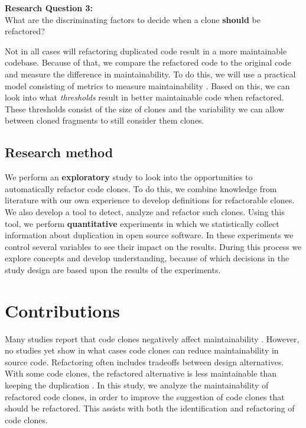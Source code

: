 \begin{displayquote}
\textbf{Research Question 3:}\\What are the discriminating factors to decide when a clone \textbf{should} be refactored?
\end{displayquote}
Not in all cases will refactoring duplicated code result in a more maintainable codebase. Because of that, we compare the refactored code to the original code and measure the difference in maintainability. To do this, we will use a practical model consisting of metrics to measure maintainability \cite{heitlager2007practical}. Based on this, we can look into what \textit{thresholds} result in better maintainable code when refactored. These thresholds consist of the size of clones and the variability we can allow between cloned fragments to still consider them clones.

\subsection{Research method}
We perform an \textbf{exploratory} study to look into the opportunities to automatically refactor code clones. To do this, we combine knowledge from literature with our own experience to develop definitions for refactorable clones. We also develop a tool to detect, analyze and refactor such clones. Using this tool, we perform \textbf{quantitative} experiments in which we statistically collect information about duplication in open source software. In these experiments we control several variables to see their impact on the results. During this process we explore concepts and develop understanding, because of which decisions in the study design are based upon the results of the experiments.

\section{Contributions}
Many studies report that code clones negatively affect maintainability \cite{heitlager2007practical, monden2002software, juergens2009code, chatterji2013effects}. However, no studies yet show in what cases code clones can reduce maintainability in source code. Refactoring often includes tradeoffs between design alternatives. With some code clones, the refactored alternative is less maintainable than keeping the duplication \cite{kapser2006cloning, aversano2007clones, hotta2010duplicate, kim2005empirical, krinke2007study, saha2010evaluating}. In this study, we analyze the maintainability of refactored code clones, in order to improve the suggestion of code clones that should be refactored. This assists with both the identification and refactoring of code clones.

